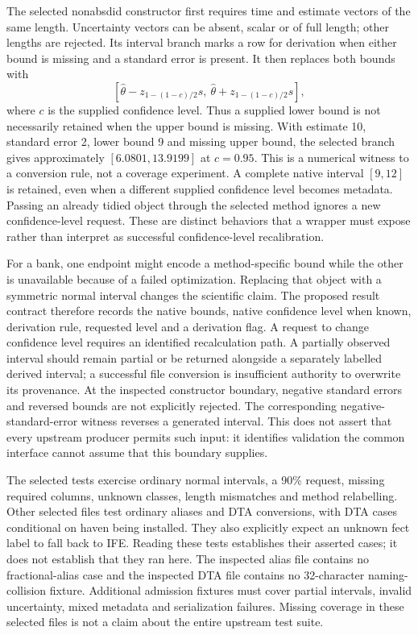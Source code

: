The selected nonabsdid constructor first requires time and estimate vectors of the same length. Uncertainty vectors can be absent, scalar or of full length; other lengths are rejected. Its interval branch marks a row for derivation when either bound is missing and a standard error is present. It then replaces both bounds with
\[
 [\widehat\theta-z_{1-(1-c)/2}s,\ \widehat\theta+z_{1-(1-c)/2}s],
\]
where $c$ is the supplied confidence level. Thus a supplied lower bound is not necessarily retained when the upper bound is missing. With estimate 10, standard error 2, lower bound 9 and missing upper bound, the selected branch gives approximately $[6.0801,13.9199]$ at $c=0.95$. This is a numerical witness to a conversion rule, not a coverage experiment. A complete native interval $[9,12]$ is retained, even when a different supplied confidence level becomes metadata. Passing an already tidied object through the selected method ignores a new confidence-level request. These are distinct behaviors that a wrapper must expose rather than interpret as successful confidence-level recalibration.~\citep{exec29_panel_inference_sources,exec29_panel_inference_reference}

For a bank, one endpoint might encode a method-specific bound while the other is unavailable because of a failed optimization. Replacing that object with a symmetric normal interval changes the scientific claim. The proposed result contract therefore records the native bounds, native confidence level when known, derivation rule, requested level and a derivation flag. A request to change confidence level requires an identified recalculation path. A partially observed interval should remain partial or be returned alongside a separately labelled derived interval; a successful file conversion is insufficient authority to overwrite its provenance. At the inspected constructor boundary, negative standard errors and reversed bounds are not explicitly rejected. The corresponding negative-standard-error witness reverses a generated interval. This does not assert that every upstream producer permits such input: it identifies validation the common interface cannot assume that this boundary supplies.~\citep{exec29_panel_inference_sources,exec29_panel_inference_reference}

The selected tests exercise ordinary normal intervals, a 90\% request, missing required columns, unknown classes, length mismatches and method relabelling. Other selected files test ordinary aliases and DTA conversions, with DTA cases conditional on haven being installed. They also explicitly expect an unknown fect label to fall back to IFE. Reading these tests establishes their asserted cases; it does not establish that they ran here. The inspected alias file contains no fractional-alias case and the inspected DTA file contains no 32-character naming-collision fixture. Additional admission fixtures must cover partial intervals, invalid uncertainty, mixed metadata and serialization failures. Missing coverage in these selected files is not a claim about the entire upstream test suite.~\citep{exec29_panel_inference_sources}

